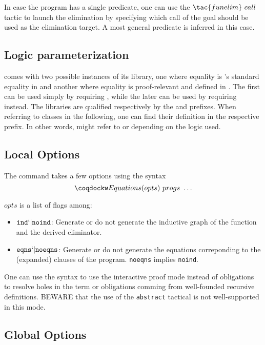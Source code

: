In case the program has a single predicate, one can use the
$\tac{funelim}~call$ tactic to launch the elimination by specifying
which call of the goal should be used as the elimination target.
A most general predicate is inferred in this case.

\subsection{Logic parameterization}

\Equations comes with two possible instances of its library,
one where equality is \Coq's standard equality  in \Prop and
another where equality is proof-relevant and defined in .
The first can be used simply by requiring ,
while the later can be used by requiring 
instead. The libraries are qualified respectively by the 
 and
 prefixes. When referring to classes in the
following, one can find their definition in the respective prefix. In
other words,
 might refer to 
or  depending on the logic used.

\subsection{Local Options}
The  command takes a few options using the syntax
\[\kw{Equations}(opts)~progs~\ldots\]

$opts$ is a list of flags among:

\begin{itemize}
\item $\texttt{ind} `| \texttt{noind}$: Generate or do not generate 
  the inductive graph of the function and the derived eliminator.
\item $\texttt{eqns} `| \texttt{noeqns}$: Generate or do not generate 
  the equations correponding to the (expanded) clauses of the program.
  \texttt{noeqns} implies \texttt{noind}.
\end{itemize}

One can use the  syntax to use the interactive proof mode
instead of obligations to resolve holes in the term or obligations
comming from well-founded recursive definitions. BEWARE that the use
of the \texttt{abstract} tactical is not well-supported in this mode.

\subsection{Global Options}

